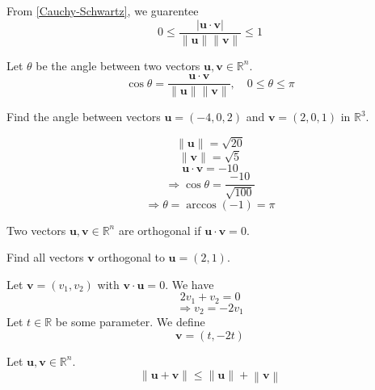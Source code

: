 \begin{corollary}
    From \ref{Cauchy-Schwartz}, we guarentee
    \[
        0\leq \frac{\left\vert \mathbf{u} \cdot \mathbf{v}  \right\vert }{\lVert \mathbf{u}  \rVert\lVert \mathbf{v}  \rVert  }\leq 1
    \]
\end{corollary}
\begin{definition}
    Let \(\theta \) be the angle between two vectors \(\mathbf{u} ,\mathbf{v} \in\mathbb{R} ^n\).
    \[
        \cos \theta =\frac{\mathbf{u} \cdot \mathbf{v} }{\lVert \mathbf{u}  \rVert\lVert \mathbf{v}  \rVert  },\quad 0\leq \theta \leq \pi 
    \]
\end{definition}
\begin{exercise}
    Find the angle between vectors \(\mathbf{u} =(-4,0,2)\) and \(\mathbf{v} =(2,0,1)\) in \(\mathbb{R} ^3\).
    \begin{answer}
        \[
            \lVert \mathbf{u}  \rVert =\sqrt{20} 
        \]
        \[
            \lVert \mathbf{v}  \rVert =\sqrt{5} 
        \]
        \[
            \mathbf{u} \cdot \mathbf{v} =-10
        \]
        \[
            \Longrightarrow \cos \theta = \frac{-10}{\sqrt{100} }
        \]
        \[
            \Longrightarrow \theta =\arccos \left( -1 \right) =\pi 
        \]
    \end{answer}
\end{exercise}
\begin{definition}
    Two vectors \(\mathbf{u} ,\mathbf{v} \in\mathbb{R} ^n\) are orthogonal if \(\mathbf{u} \cdot \mathbf{v} =0\).
\end{definition}
\begin{exercise}
    Find all vectors \(\mathbf{v} \) orthogonal to \(\mathbf{u} =(2,1)\). 
    \begin{answer}
        Let \(\mathbf{v} =\left( v_1,v_2 \right) \) with \(\mathbf{v} \cdot \mathbf{u} =0\). We have
        \[
            2v_1 + v_2 = 0
        \]
        \[
            \Longrightarrow v_2 = -2v_1
        \]
        Let \(t\in\mathbb{R}\) be some parameter. We define 
        \[
            \mathbf{v} =(t,-2t)
        \]
    \end{answer}
\end{exercise}
\begin{theorem}
    Let \(\mathbf{u} ,\mathbf{v} \in\mathbb{R} ^n\).
    \[
        \left\lVert \mathbf{u} +\mathbf{v}  \right\rVert \leq \left\lVert \mathbf{u}  \right\rVert +\left\lVert \mathbf{v}  \right\rVert 
    \]
\end{theorem}
